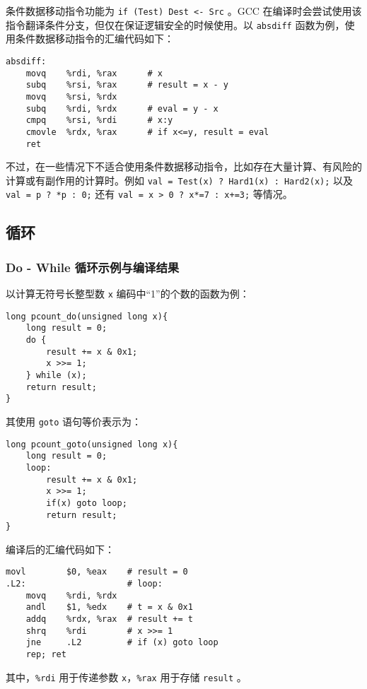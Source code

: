 条件数据移动指令功能为 \texttt{if (Test)  {Dest <- Src}} 。GCC 在编译时会尝试使用该指令翻译条件分支，但仅在保证逻辑安全的时候使用。以 \texttt{absdiff} 函数为例，使用条件数据移动指令的汇编代码如下：
\begin{verbatim}
absdiff:
    movq    %rdi, %rax      # x
    subq    %rsi, %rax      # result = x - y
    movq    %rsi, %rdx
    subq    %rdi, %rdx      # eval = y - x
    cmpq    %rsi, %rdi      # x:y
    cmovle  %rdx, %rax      # if x<=y, result = eval
    ret
\end{verbatim}
不过，在一些情况下不适合使用条件数据移动指令，比如存在大量计算、有风险的计算或有副作用的计算时。例如 \texttt{val = Test(x) ? Hard1(x) : Hard2(x);} 以及 \texttt{val = p ? *p : 0;} 还有 \texttt{val = x > 0 ? x*=7 : x+=3;} 等情况。

\subsection{循环}
\subsubsection{Do - While 循环示例与编译结果}
以计算无符号长整型数 \texttt{x} 编码中“1”的个数的函数为例：
\begin{verbatim}
long pcount_do(unsigned long x){
    long result = 0;
    do {
        result += x & 0x1;
        x >>= 1;
    } while (x);
    return result;
}
\end{verbatim}
其使用 \texttt{goto} 语句等价表示为：
\begin{verbatim}
long pcount_goto(unsigned long x){
    long result = 0;
    loop:
        result += x & 0x1;
        x >>= 1;
        if(x) goto loop;
        return result;
}
\end{verbatim}
编译后的汇编代码如下：
\begin{verbatim}
movl        $0, %eax    # result = 0
.L2:                    # loop:
    movq    %rdi, %rdx
    andl    $1, %edx    # t = x & 0x1
    addq    %rdx, %rax  # result += t
    shrq    %rdi        # x >>= 1
    jne     .L2         # if (x) goto loop
    rep; ret
\end{verbatim}
其中，\texttt{\%rdi} 用于传递参数 \texttt{x}，\texttt{\%rax} 用于存储 \texttt{result} 。

